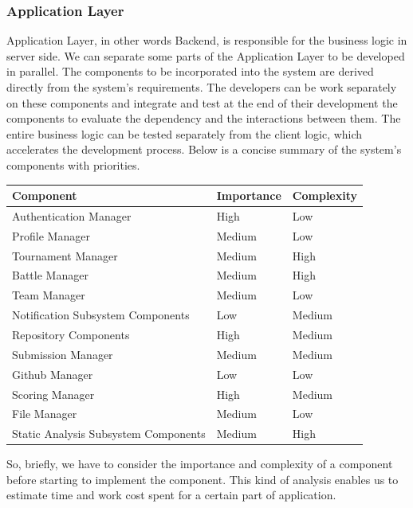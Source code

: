 \subsubsection{Application Layer}
Application Layer, in other words Backend, is responsible for the business logic in server side. We can separate some parts of the Application Layer to be developed in parallel.
The components to be incorporated into the system are derived directly from the system's requirements. The developers can be work separately on these components and integrate and test at the end of their development the components to evaluate the dependency and the interactions between them. The entire business logic can be tested separately from the client logic, which accelerates the development process. Below is a concise summary of the system's components with priorities.
\begin{tabularx}{0.8\textwidth} { 
  | >{\raggedright\arraybackslash}X 
  | >{\centering\arraybackslash}X 
  | >{\raggedleft\arraybackslash}X | }
 \hline
\textbf{Component} & \textbf{Importance} &  \textbf{Complexity} \\
 \hline
 Authentication Manager  & High  & Low  \\
  \hline
 Profile Manager  & Medium  & Low  \\
\hline
 Tournament Manager  & Medium  & High  \\
\hline
 Battle Manager  & Medium  & High  \\
\hline
 Team Manager  & Medium  & Low  \\
\hline
 Notification Subsystem Components  & Low  & Medium  \\
\hline
 Repository Components  & High  & Medium  \\
\hline
 Submission Manager  & Medium  & Medium  \\
\hline
 Github Manager  & Low  & Low  \\
\hline
 Scoring Manager  & High  & Medium  \\
\hline
 File Manager  & Medium  & Low  \\
\hline
 Static Analysis Subsystem Components  & Medium  & High  \\
\hline
\end{tabularx}

So, briefly, we have to consider the importance and complexity of a component before starting to implement the component. This kind of analysis enables us to estimate time and work cost spent for a certain part of application.
\\

